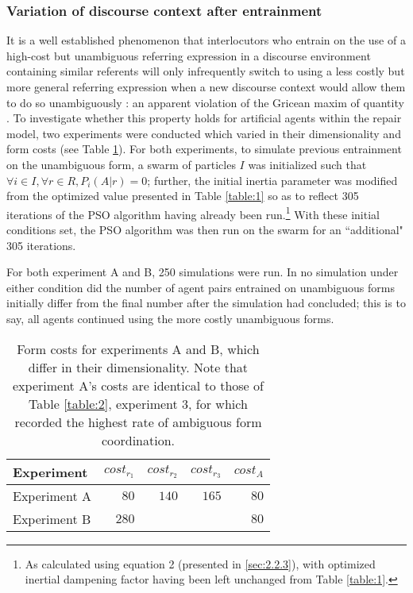 \documentclass[12pt,a4paper]{article}
\begin{document}
\subsubsection{Variation of discourse context after entrainment}
It is a well established phenomenon that interlocutors who entrain on the use of a high-cost but unambiguous referring expression in a discourse environment containing similar referents will only infrequently switch to using a less costly but more general referring expression when a new discourse \mbox{context} would allow them to do so unambiguously \citep{brennan1996}: an apparent violation of the Gricean maxim of quantity \citep{grice1975}. To investigate whether this property holds for artificial agents within the repair model, two experiments were conducted which varied in their dimensionality and form costs (see Table \ref{table:4}). For both experiments, to simulate previous entrainment on the unambiguous form, a swarm of particles $I$ was initialized such that $\forall i \in I, \forall r \in R, P_i(A|r) = 0$; further, the initial inertia parameter was modified from the optimized value presented in Table \ref{table:1} so as to reflect 305 iterations of the PSO algorithm having already been run.\footnote{As calculated using equation 2 (presented in \ref{sec:2.2.3}), with optimized inertial dampening factor having been left unchanged from Table \ref{table:1}.} With these initial conditions set, the PSO algorithm was then run on the swarm for an ``additional" 305 iterations.

For both experiment A and B, 250 simulations were run. In no simulation under either condition did the number of agent pairs entrained on unambiguous forms initially differ from the final number after the simulation had concluded; this is to say, all agents continued using the more costly unambiguous forms.

\begin{table}
\begin{center}
    \begin{tabular}{ l r r r r }
    Experiment & $cost_{r_1}$ & $cost_{r_2}$ & $cost_{r_3}$ & $cost_A$\\ \hline
    Experiment A & $80$  & $140$ & $165$ & $80$ \\ \hline
    Experiment B & $280$ &       &       & $80$ \\ \hline
    \end{tabular}
    \caption{Form costs for experiments A and B, which differ in their dimensionality. Note that experiment A's costs are identical to those of Table \ref{table:2}, experiment 3, for which \citeauthor{rohde2012} recorded the highest rate of ambiguous form coordination.}
    \label{table:4}
\end{center}
\end{table}
\end{document}

